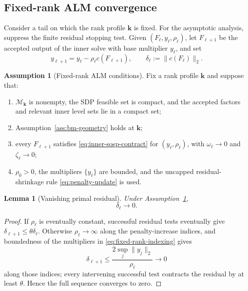 \documentclass[11pt]{article}
\newtheorem{lemma}{Lemma}
\theoremstyle{definition}
\newtheorem{assumption}{Assumption}
\theoremstyle{remark}
\begin{document}
\subsection{Fixed-rank ALM convergence}
\label{subsec:fixed-rank-convergence}

Consider a tail on which the rank profile $\mathbf k$ is fixed.  For
the asymptotic analysis, suppress the finite residual stopping test.  Given
$(F_\ell,y_\ell,\rho_\ell)$, let $F_{\ell+1}$ be the accepted output of the
inner solve with base multiplier $y_\ell$, and set
\begin{equation}
  y_{\ell+1}=y_\ell-\rho_\ell c(F_{\ell+1}),
  \qquad
  \delta_\ell:=\|c(F_\ell)\|_2.
  \label{eq:fixed-rank-indexing}
\end{equation}

\begin{assumption}[Fixed-rank ALM conditions]
\label{ass:fixed-rank-alm}
Fix a rank profile $\mathbf k$ and suppose that:
\begin{enumerate}
  \item[(A1)] $\mathcal M_{\mathbf k}$ is nonempty, the SDP feasible set is
  compact, and the accepted factors and relevant inner level sets lie in a
  compact set;
  \item[(A2)] Assumption~\ref{ass:bm-geometry} holds at $\mathbf k$;
  \item[(A3)] every $F_{\ell+1}$ satisfies
  \eqref{eq:inner-sosp-contract} for $(y_\ell,\rho_\ell)$, with
  $\omega_\ell\to0$ and $\zeta_\ell\to0$;
  \item[(A4)] $\rho_0>0$, the multipliers $\{y_\ell\}$ are bounded, and the
  uncapped residual-shrinkage rule \eqref{eq:penalty-update} is used.
\end{enumerate}
\end{assumption}

\begin{lemma}[Vanishing primal residual]
\label{lem:vanishing-residual}
Under Assumption~\ref{ass:fixed-rank-alm},
\begin{equation}
  \delta_\ell\longrightarrow0.
  \label{eq:residual-vanishes}
\end{equation}
\end{lemma}

\begin{proof}
If $\rho_\ell$ is eventually constant, successful residual tests eventually
give $\delta_{\ell+1}\leq\theta\delta_\ell$.  Otherwise
$\rho_\ell\to\infty$ along the penalty-increase indices, and boundedness of
the multipliers in \eqref{eq:fixed-rank-indexing} gives
\[
  \delta_{\ell+1}
  \leq\frac{2\sup_j\|y_j\|_2}{\rho_\ell}\longrightarrow0
\]
along those indices; every intervening successful test contracts the
residual by at least $\theta$.  Hence the full sequence converges to zero.
\end{proof}
\end{document}
